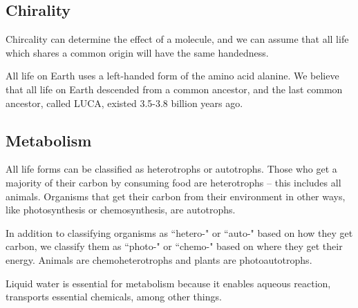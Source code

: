 \documentclass[class=article, crop=false]{standalone}
\begin{document}
\subsection{Chirality}
Chircality can determine the effect of a molecule, and we can assume that all life which shares a common origin will have the same handedness.
\par
All life on Earth uses a left-handed form of the amino acid alanine. We believe that all life on Earth descended from a common ancestor, and the last common ancestor, called LUCA, existed 3.5-3.8 billion years ago.
\subsection{Metabolism}
All life forms can be classified as heterotrophs or autotrophs. Those who get a majority of their carbon by consuming food are heterotrophs -- this includes all animals. Organisms that get their carbon from their environment in other ways, like photosynthesis or chemosynthesis, are autotrophs.
\par
In addition to classifying organisms as ``hetero-" or ``auto-" based on how they get carbon, we classify them as ``photo-" or ``chemo-" based on where they get their energy. Animals are chemoheterotrophs and plants are photoautotrophs.
\par
Liquid water is essential for metabolism because it enables aqueous reaction, transports essential chemicals, among other things.
\end{document}
